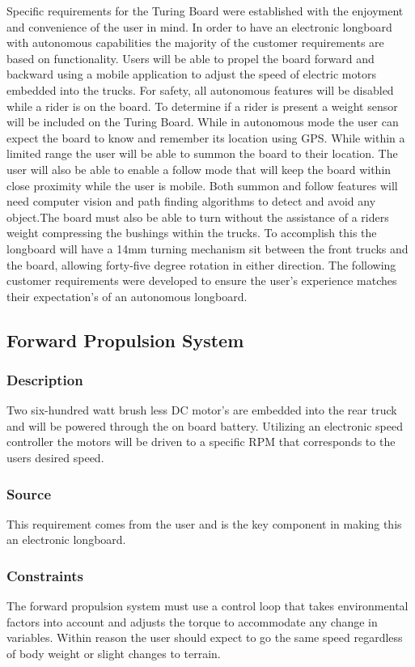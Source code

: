 Specific requirements for the Turing Board were established with the enjoyment and convenience of the user in mind. In order to have an electronic longboard with autonomous capabilities the majority of the customer requirements are based on functionality. Users will be able to propel the board forward and backward using a mobile application to adjust the speed of electric motors embedded into the trucks. For safety, all autonomous features will be disabled while a rider is on the board. To determine if a rider is present a weight sensor will be included on the Turing Board. While in autonomous mode the user can expect the board to know and remember its location using GPS. While within a limited range the user will be able to summon the board to their location. The user will also be able to enable a follow mode that will keep the board within close proximity while the user is mobile. Both summon and follow features will need computer vision and path finding algorithms to detect and avoid any object.The board must also be able to turn without the assistance of a riders weight compressing the bushings within the trucks. To accomplish this the longboard will have a 14mm turning mechanism sit between the front trucks and the board, allowing forty-five degree rotation in either direction. The following customer requirements were developed to ensure the user's experience matches their expectation's of an autonomous longboard.

\subsection{Forward Propulsion System}
\subsubsection{Description}
Two six-hundred watt brush less DC motor's are embedded into the rear truck and will be powered through the on board battery. Utilizing an electronic speed controller the motors will be driven to a specific RPM that corresponds to the users desired speed.
\subsubsection{Source}
This requirement comes from the user and is the key component in making this an electronic longboard.
\subsubsection{Constraints}
The forward propulsion system must use a control loop that takes environmental factors into account and adjusts the torque to accommodate any change in variables. Within reason the user should expect to go the same speed regardless of body weight or slight changes to terrain.
